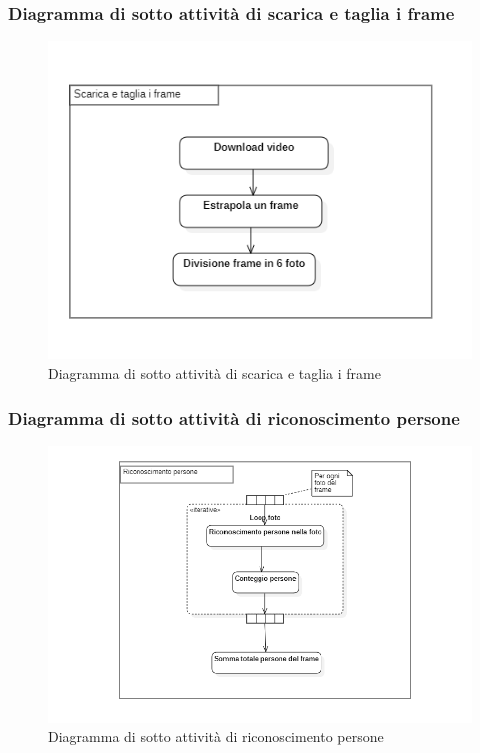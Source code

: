 \subsubsection{Diagramma di sotto attività di scarica e taglia i frame}\label{DiagrammaSottoAttivitaDownloadECutFrameVideo}
\begin{center}
	\begin{figure}[H]
		\centering\includegraphics[scale=0.8]
    {../immagini/diag_PB/download_e_cut_frames.png}
		\caption{Diagramma di sotto attività di scarica e taglia i frame}
	\end{figure}
\end{center}

\subsubsection{Diagramma di sotto attività di riconoscimento persone}\label{DiagrammaSottoAttivitaRiconoscimentoPersone}
\begin{center}
	\begin{figure}[H]
		\centering\includegraphics[scale=0.8]
    {../immagini/diag_PB/conta_persone.png}
		\caption{Diagramma di sotto attività di riconoscimento persone}
	\end{figure}
\end{center}

